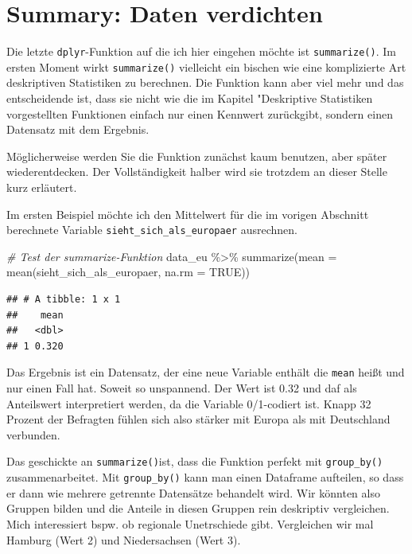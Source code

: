 \documentclass[
]{book}
\newenvironment{Shaded}{\begin{snugshade}}{\end{snugshade}}
\newcommand{\AttributeTok}[1]{\textcolor[rgb]{0.77,0.63,0.00}{#1}}
\newcommand{\CommentTok}[1]{\textcolor[rgb]{0.56,0.35,0.01}{\textit{#1}}}
\newcommand{\ConstantTok}[1]{\textcolor[rgb]{0.00,0.00,0.00}{#1}}
\newcommand{\FunctionTok}[1]{\textcolor[rgb]{0.00,0.00,0.00}{#1}}
\newcommand{\NormalTok}[1]{#1}
\newcommand{\SpecialCharTok}[1]{\textcolor[rgb]{0.00,0.00,0.00}{#1}}
\begin{document}
\hypertarget{summary-daten-verdichten}{%
\section{Summary: Daten verdichten}\label{summary-daten-verdichten}}

Die letzte \texttt{dplyr}-Funktion auf die ich hier eingehen möchte ist \texttt{summarize()}. Im ersten Moment wirkt \texttt{summarize()} vielleicht ein bischen wie eine komplizierte Art deskriptiven Statistiken zu berechnen. Die Funktion kann aber viel mehr und das entscheidende ist, dass sie nicht wie die im Kapitel "Deskriptive Statistiken vorgestellten Funktionen einfach nur einen Kennwert zurückgibt, sondern einen Datensatz mit dem Ergebnis.

Möglicherweise werden Sie die Funktion zunächst kaum benutzen, aber später wiederentdecken. Der Vollständigkeit halber wird sie trotzdem an dieser Stelle kurz erläutert.

Im ersten Beispiel möchte ich den Mittelwert für die im vorigen Abschnitt berechnete Variable \texttt{sieht\_sich\_als\_europaer} ausrechnen.

\begin{Shaded}
\begin{Highlighting}[]
\CommentTok{\# Test der summarize{-}Funktion}
\NormalTok{data\_eu }\SpecialCharTok{\%\textgreater{}\%} 
  \FunctionTok{summarize}\NormalTok{(}\AttributeTok{mean =} \FunctionTok{mean}\NormalTok{(sieht\_sich\_als\_europaer, }\AttributeTok{na.rm =} \ConstantTok{TRUE}\NormalTok{))}
\end{Highlighting}
\end{Shaded}

\begin{verbatim}
## # A tibble: 1 x 1
##    mean
##   <dbl>
## 1 0.320
\end{verbatim}

Das Ergebnis ist ein Datensatz, der eine neue Variable enthält die \texttt{mean} heißt und nur einen Fall hat. Soweit so unspannend. Der Wert ist 0.32 und daf als Anteilswert interpretiert werden, da die Variable 0/1-codiert ist. Knapp 32 Prozent der Befragten fühlen sich also stärker mit Europa als mit Deutschland verbunden.

Das geschickte an \texttt{summarize()}ist, dass die Funktion perfekt mit \texttt{group\_by()} zusammenarbeitet. Mit \texttt{group\_by()} kann man einen Dataframe aufteilen, so dass er dann wie mehrere getrennte Datensätze behandelt wird. Wir könnten also Gruppen bilden und die Anteile in diesen Gruppen rein deskriptiv vergleichen. Mich interessiert bspw. ob regionale Unetrschiede gibt. Vergleichen wir mal Hamburg (Wert 2) und Niedersachsen (Wert 3).
\end{document}
